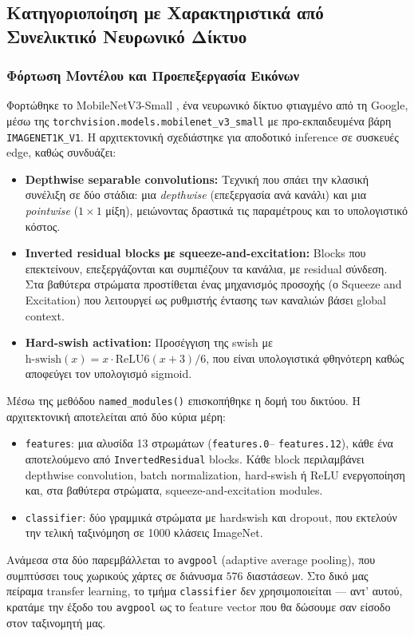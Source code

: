 \documentclass[12pt, a4paper]{article}
\begin{document}
\subsection{Κατηγοριοποίηση με Χαρακτηριστικά από Συνελικτικό Νευρωνικό Δίκτυο}

\subsubsection{Φόρτωση Μοντέλου και Προεπεξεργασία Εικόνων}

Φορτώθηκε το MobileNetV3-Small \cite{howard2019}, ένα νευρωνικό δίκτυο φτιαγμένο από τη Google, μέσω της \texttt{torchvision.models.mobilenet\_v3\_small}
με προ-εκπαιδευμένα βάρη \texttt{IMAGENET1K\_V1}. Η αρχιτεκτονική σχεδιάστηκε για
αποδοτικό inference σε συσκευές edge, καθώς συνδυάζει:
\begin{itemize}
    \item \textbf{Depthwise separable convolutions:} Τεχνική που σπάει την κλασική συνέλιξη σε δύο στάδια: μια \textit{depthwise} (επεξεργασία ανά κανάλι) και μια \textit{pointwise} ($1 \times 1$ μίξη), μειώνοντας δραστικά τις παραμέτρους και το υπολογιστικό κόστος.
    \item \textbf{Inverted residual blocks με squeeze-and-excitation:} Blocks που επεκτείνουν, επεξεργάζονται και συμπιέζουν τα κανάλια, με residual σύνδεση. Στα βαθύτερα στρώματα προστίθεται ένας μηχανισμός προσοχής (ο Squeeze and Excitation) που λειτουργεί ως ρυθμιστής έντασης των καναλιών βάσει global context.
    \item \textbf{Hard-swish activation:} Προσέγγιση της swish με $\text{h-swish}(x) = x \cdot \text{ReLU6}(x+3)/6$, που είναι υπολογιστικά φθηνότερη καθώς αποφεύγει τον υπολογισμό sigmoid.
\end{itemize}

Μέσω της μεθόδου \texttt{named\_modules()} επισκοπήθηκε η δομή του δικτύου. Η
αρχιτεκτονική αποτελείται από δύο κύρια μέρη:
\begin{itemize}
    \item \texttt{features}: μια αλυσίδα 13 στρωμάτων (\texttt{features.0}–%
    \texttt{features.12}), κάθε ένα αποτελούμενο από \texttt{InvertedResidual}
    blocks. Κάθε block περιλαμβάνει depthwise convolution, batch normalization,
    hard-swish ή ReLU ενεργοποίηση και, στα βαθύτερα στρώματα,
    squeeze-and-excitation modules.
    \item \texttt{classifier}: δύο γραμμικά στρώματα με hardswish και dropout,
    που εκτελούν την τελική ταξινόμηση σε 1000 κλάσεις ImageNet.
\end{itemize}
Ανάμεσα στα δύο παρεμβάλλεται το \texttt{avgpool} (adaptive average pooling),
που συμπτύσσει τους χωρικούς χάρτες σε διάνυσμα $576$ διαστάσεων. Στο δικό μας
πείραμα transfer learning, το τμήμα \texttt{classifier} δεν χρησιμοποιείται — αντ' αυτού,
κρατάμε την έξοδο του \texttt{avgpool} ως το feature vector που θα δώσουμε σαν είσοδο στον ταξινομητή μας.
\end{document}
